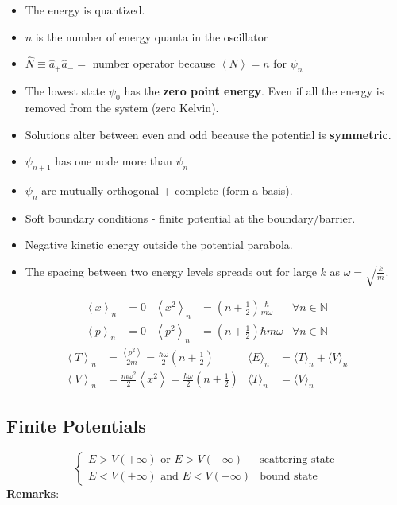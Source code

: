 \begin{itemize}
    \item The energy is quantized.
    \item $n$ is the number of energy quanta in the oscillator
    \item $\widehat{N} \equiv \widehat{a}_{+}\widehat{a}_{-} = $ number operator because $\left<N\right> = n$ for $\psi_n$
    \item The lowest state $\psi_0$ has the \textbf{zero point energy}. Even if all the energy is removed from the system (zero Kelvin).
    \item Solutions alter between even and odd because the potential is \textbf{symmetric}.
    \item $\psi_{n+1}$ has one node more than $\psi_n$
    \item $\psi_n$ are mutually orthogonal + complete (form a basis).
    \item Soft boundary conditions - finite potential at the boundary/barrier.
    \item Negative kinetic energy outside the potential parabola.
    \item The spacing between two energy levels spreads out for large $k$ as $\omega=\sqrt{\frac{k}{m}}$.
\end{itemize}

\noindent\begin{align*}
    \left\langle x \right\rangle _n & = 0 & \left\langle x^2 \right\rangle _n & = \left(n+\frac{1}{2}\right)\frac{\hbar}{m\omega} & \forall n \in \mathbb{N} \\
    \left\langle p \right\rangle _n & = 0 & \left\langle p^2 \right\rangle _n & = \left(n+\frac{1}{2}\right)\hbar m\omega         & \forall n \in \mathbb{N}
\end{align*}
\noindent\begin{align*}
    \left\langle T \right\rangle _n & = \frac{\left\langle p^2 \right\rangle}{2m} =  \frac{\hbar \omega}{2}\left(n+\frac{1}{2}\right)        & \langle E\rangle_n & =  \langle T\rangle_n +\langle V\rangle_n \\
    \left\langle V \right\rangle _n & = \frac{m\omega^2}{2}\left\langle x^2 \right\rangle = \frac{\hbar \omega}{2}\left(n+\frac{1}{2}\right) & \langle T\rangle_n & =  \langle V\rangle_n
\end{align*}

\subsection{Finite Potentials}
\noindent\begin{equation*}
    \begin{cases}
        E > V(+\infty)\text{ or } E > V(-\infty)  & \text{scattering state} \\
        E < V(+\infty)\text{ and } E < V(-\infty) & \text{bound state}
    \end{cases}
\end{equation*}
\textbf{Remarks}:

